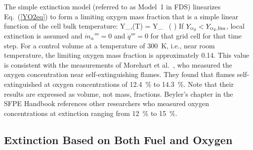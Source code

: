 The simple extinction model (referred to as Model~1 in FDS) linearizes Eq.~(\ref{YO2eq}) to form a limiting oxygen mass fraction that is a simple linear function of the cell bulk temperature:
\be
   Y_{\OTWO,\lim}(T) = Y_{\OI} \, \left(  \right)  \label{extinction_model}
\ee 
If $Y_{\text{\tiny \hbox{O}$_2$}}<Y_{\text{\tiny \hbox{O}$_2$},\lim}$, local extinction is assumed and $\dot{m}_\alpha'''=0$ and $\dot{q}'''=0$ for that grid cell for that time step. For a control volume at a temperature of \SI{300}{K}, i.e., near room temperature, the limiting oxygen mass fraction is approximately 0.14.  This value is consistent with the measurements of Morehart et al.~\cite{Morehart:1991}, who measured the oxygen concentration near self-extinguishing flames. They found that flames self-extinguished at oxygen concentrations of 12.4~\% to 14.3~\%. Note that their results are expressed as volume, not mass, fractions. Beyler's chapter in the SFPE Handbook references other researchers who measured oxygen concentrations at extinction ranging from 12~\% to 15~\%.


\subsection{Extinction Based on Both Fuel and Oxygen}


